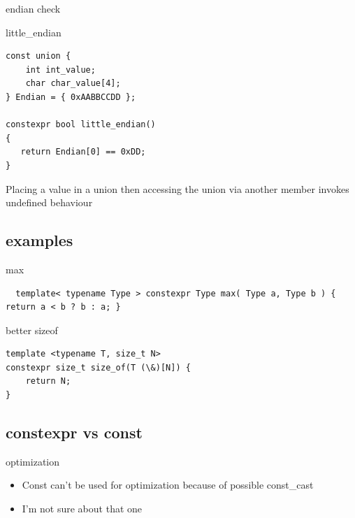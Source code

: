 \documentclass{beamer}
\begin{document}
\begin{frame}{endian check}
  \begin{block}{little\_endian}
\begin{verbatim}
const union {
    int int_value;
    char char_value[4];
} Endian = { 0xAABBCCDD };

constexpr bool little_endian()
{
   return Endian[0] == 0xDD;
}

\end{verbatim}
Placing a value in a union then accessing the union via another
member invokes undefined behaviour
  \end{block}
\end{frame}

\subsection{examples}
\begin{frame}{max}
\begin{verbatim}
  template< typename Type > constexpr Type max( Type a, Type b ) { return a < b ? b : a; }

\end{verbatim}
\end{frame}

\begin{frame}{better sizeof}
  \begin{block}{}
\begin{verbatim}
template <typename T, size_t N>
constexpr size_t size_of(T (\&)[N]) {
    return N;
}

\end{verbatim}
  \end{block}
\end{frame}

\subsection{constexpr vs const}
\begin{frame}{optimization}
  \begin{block}{}
    \begin{itemize}
    \item Const can't be used for optimization because of possible const\_cast
    \item I'm not sure about that one
    \end{itemize}
  \end{block}
\end{frame}
\end{document}
